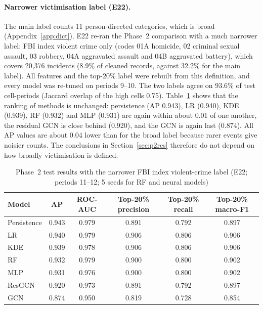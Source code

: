 \documentclass[11pt,a4paper]{report}
\begin{document}
\paragraph{Narrower victimisation label (E22).} The main label counts 11 person-directed categories, which is broad (Appendix~\ref{app:dict}). E22 re-ran the Phase~2 comparison with a much narrower label: FBI index violent crime only (codes 01A homicide, 02 criminal sexual assault, 03 robbery, 04A aggravated assault and 04B aggravated battery), which covers 20,376 incidents (8.9\% of cleaned records, against 32.2\% for the main label). All features and the top-20\% label were rebuilt from this definition, and every model was re-tuned on periods 9--10. The two labels agree on 93.6\% of test cell-periods (Jaccard overlap of the high cells 0.75). Table~\ref{tab:violent} shows that the ranking of methods is unchanged: persistence (AP 0.943), LR (0.940), KDE (0.939), RF (0.932) and MLP (0.931) are again within about 0.01 of one another, the residual GCN is close behind (0.920), and the GCN is again last (0.874). All AP values are about 0.04 lower than for the broad label because rarer events give noisier counts. The conclusions in Section~\ref{sec:p2res} therefore do not depend on how broadly victimisation is defined.

\begin{table}[H]
\centering\small
\caption{Phase~2 test results with the narrower FBI index violent-crime label (E22; periods 11--12; 5 seeds for RF and neural models)}
\label{tab:violent}
\begin{tabular}{@{}lccccc@{}}
\toprule
Model & AP & ROC-AUC & Top-20\% precision & Top-20\% recall & Top-20\% macro-F1\\
\midrule
Persistence & 0.943 & 0.979 & 0.891 & 0.792 & 0.897\\
LR & 0.940 & 0.979 & 0.906 & 0.806 & 0.906\\
KDE & 0.939 & 0.978 & 0.906 & 0.806 & 0.906\\
RF & 0.932 & 0.979 & 0.900 & 0.800 & 0.902\\
MLP & 0.931 & 0.976 & 0.900 & 0.800 & 0.902\\
ResGCN & 0.920 & 0.973 & 0.891 & 0.792 & 0.897\\
GCN & 0.874 & 0.950 & 0.819 & 0.728 & 0.854\\
\bottomrule
\end{tabular}
\end{table}
\end{document}
